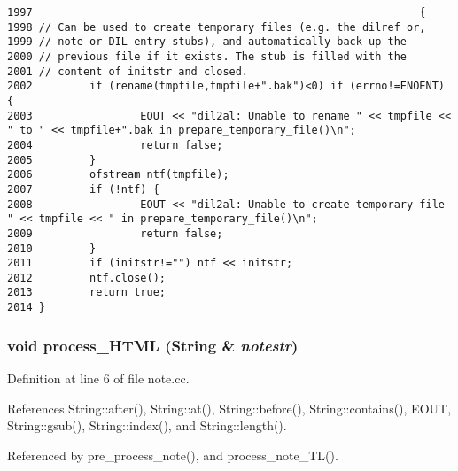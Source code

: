 \footnotesize\begin{verbatim}1997                                                             {
1998 // Can be used to create temporary files (e.g. the dilref or,
1999 // note or DIL entry stubs), and automatically back up the
2000 // previous file if it exists. The stub is filled with the
2001 // content of initstr and closed.
2002         if (rename(tmpfile,tmpfile+".bak")<0) if (errno!=ENOENT) {
2003                 EOUT << "dil2al: Unable to rename " << tmpfile << " to " << tmpfile+".bak in prepare_temporary_file()\n";
2004                 return false;
2005         }
2006         ofstream ntf(tmpfile);
2007         if (!ntf) {
2008                 EOUT << "dil2al: Unable to create temporary file " << tmpfile << " in prepare_temporary_file()\n";
2009                 return false;
2010         }
2011         if (initstr!="") ntf << initstr;
2012         ntf.close();
2013         return true;
2014 }
\end{verbatim}\normalsize 
{}
\subsubsection{\setlength{\rightskip}{0pt plus 5cm}void process\_\-HTML ({\bf String} \& {\em notestr})}\label{dil2al_8hh_a329}




Definition at line 6 of file note.cc.

References String::after(), String::at(), String::before(), String::contains(), EOUT, String::gsub(), String::index(), and String::length().

Referenced by pre\_\-process\_\-note(), and process\_\-note\_\-TL().



